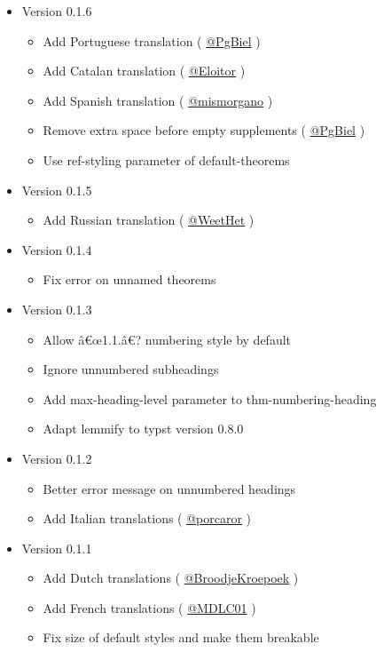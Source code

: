 \begin{itemize}
\item
  Version 0.1.6

  \begin{itemize}
  \tightlist
  \item
    Add Portuguese translation (
    \href{https://github.com/PgBiel}{@PgBiel} )
  \item
    Add Catalan translation (
    \href{https://github.com/Eloitor}{@Eloitor} )
  \item
    Add Spanish translation (
    \href{https://github.com/mismorgano}{@mismorgano} )
  \item
    Remove extra space before empty supplements (
    \href{https://github.com/PgBiel}{@PgBiel} )
  \item
    Use ref-styling parameter of default-theorems
  \end{itemize}
\item
  Version 0.1.5

  \begin{itemize}
  \tightlist
  \item
    Add Russian translation (
    \href{https://github.com/WeetHet}{@WeetHet} )
  \end{itemize}
\item
  Version 0.1.4

  \begin{itemize}
  \tightlist
  \item
    Fix error on unnamed theorems
  \end{itemize}
\item
  Version 0.1.3

  \begin{itemize}
  \tightlist
  \item
    Allow â€œ1.1.â€? numbering style by default
  \item
    Ignore unnumbered subheadings
  \item
    Add max-heading-level parameter to thm-numbering-heading
  \item
    Adapt lemmify to typst version 0.8.0
  \end{itemize}
\item
  Version 0.1.2

  \begin{itemize}
  \tightlist
  \item
    Better error message on unnumbered headings
  \item
    Add Italian translations (
    \href{https://github.com/porcaror}{@porcaror} )
  \end{itemize}
\item
  Version 0.1.1

  \begin{itemize}
  \tightlist
  \item
    Add Dutch translations (
    \href{https://github.com/BroodjeKroepoek}{@BroodjeKroepoek} )
  \item
    Add French translations ( \href{https://github.com/MDLC01}{@MDLC01}
    )
  \item
    Fix size of default styles and make them breakable
  \end{itemize}
\end{itemize}

